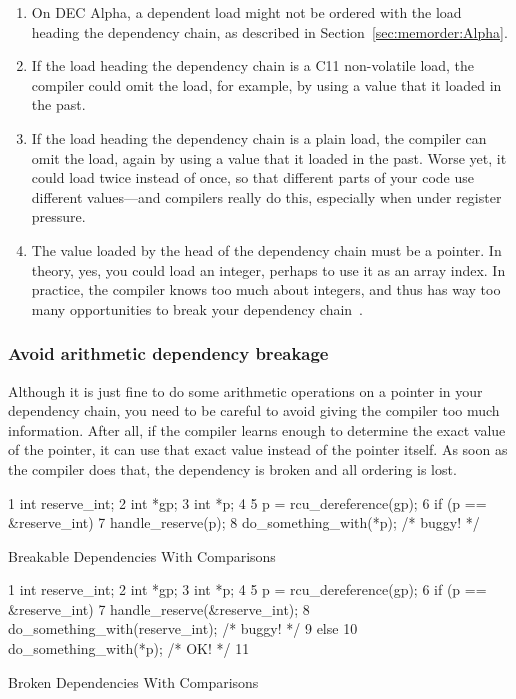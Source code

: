 \begin{enumerate}
\item	On DEC Alpha, a dependent load might not be ordered with
	the load heading the dependency chain, as described in
	Section~\ref{sec:memorder:Alpha}.
\item	If the load heading the dependency chain is a
	C11 non-volatile  load,
	the compiler could omit the load, for example, by using a value
	that it loaded in the past.
\item	If the load heading the dependency chain is a plain load,
	the compiler can omit the load, again by using a value
	that it loaded in the past.
	Worse yet, it could load twice instead of once, so that
	different parts of your code use different values---and
	compilers really do this, especially when under register
	pressure.
\item	The value loaded by the head of the dependency chain must
	be a pointer.
	In theory, yes, you could load an integer, perhaps to use
	it as an array index.
	In practice, the compiler knows too much about integers,
	and thus has way too many opportunities to break your
	dependency chain~\cite{PaulEMcKennneyConsumeP0190R4}.
\end{enumerate}

\subsubsection{Avoid arithmetic dependency breakage}
Although it is just fine to do some arithmetic operations on a pointer in
your dependency chain, you need to be careful to avoid giving the
compiler too much information.
After all, if the compiler learns enough to determine the exact value
of the pointer, it can use that exact value instead of the pointer itself.
As soon as the compiler does that, the dependency is broken and all
ordering is lost.

\begin{listing}[tbp]
{ \scriptsize
\begin{verbbox}
 1 int reserve_int;
 2 int *gp;
 3 int *p;
 4
 5 p = rcu_dereference(gp);
 6 if (p == &reserve_int)
 7   handle_reserve(p);
 8 do_something_with(*p); /* buggy! */
\end{verbbox}
}
\centering
\theverbbox
\caption{Breakable Dependencies With Comparisons}
\label{lst:memorder:Breakable Dependencies With Comparisons}
\end{listing}

\begin{listing}[tbp]
{ \scriptsize
\begin{verbbox}
 1 int reserve_int;
 2 int *gp;
 3 int *p;
 4
 5 p = rcu_dereference(gp);
 6 if (p == &reserve_int) {
 7   handle_reserve(&reserve_int);
 8   do_something_with(reserve_int); /* buggy! */
 9 } else {
10   do_something_with(*p); /* OK! */
11 }
\end{verbbox}
}
\centering
\theverbbox
\caption{Broken Dependencies With Comparisons}
\label{lst:memorder:Broken Dependencies With Comparisons}
\end{listing}

